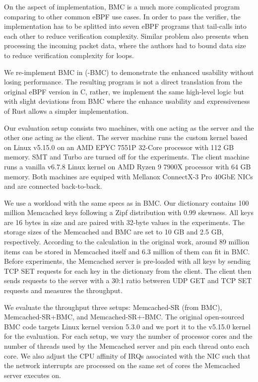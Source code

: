 On the aspect of implementation, BMC is a much more complicated program
    comparing to other common eBPF use cases.
In order to pass the verifier, the implementation has to be splitted into seven
    eBPF programs that tail-calls into each other to reduce verification
    complexity.
Similar problem also presents when processing the incoming packet data, where
    the authors had to bound data size to reduce verification complexity for
    loops.

We re-implement BMC in \projname{} (\projname{}-BMC) to demonstrate the
    enhanced usability without losing performance.
The resulting program is not a direct translation from the original eBPF
    version in C, rather, we implement the same high-level logic but with
    slight deviations from BMC where the enhance usability and expressiveness
    of Rust allows a simpler implementation.

Our evaluation setup consists two machines, with one
    acting as the server and the other one acting as the client.
The server machine runs the \projname{} custom kernel based on Linux v5.15.0 on
    an AMD EPYC 7551P 32-Core processor with 112 GB memory.
SMT and Turbo are turned off for the experiments.
The client machine runs a vanilla v6.7.8 Linux kernel on AMD Ryzen 9 7900X
    processor with 64 GB memory.
Both machines are equiped with Mellanox ConnectX-3 Pro 40GbE NICs and are
    connected back-to-back.


We use a workload with the same specs as in BMC.
Our dictionary contains 100 million Memcached keys following a Zipf
    distribution with 0.99 skewness.
All keys are 16 bytes in size and are paired with 32-byte values in the
    experiments.
The storage sizes of the Memcached and BMC are set to 10 GB and 2.5 GB,
    respectively.
According to the calculation in the original work, around 89 million items
    can be stored in Memcached itself and 6.3 million of them can fit in
    BMC.
Before experiments, the Memcached server is pre-loaded with all keys by
    sending TCP SET requests for each key in the dictionary from the client.
The client then sends requests to the server with a 30:1 ratio betweren UDP GET and
    TCP SET requests and measures the throughput.

We evaluate the throughput three setups: Memcached-SR (from BMC),
    Memcached-SR+BMC, and Memcached-SR+\projname{}-BMC.
The original open-sourced BMC code targets Linux kernel version 5.3.0 and we
    port it to the v5.15.0 \projname{} kernel for the evaluation.
For each setup, we vary the number of processor cores and the number of threads
    used by the Memcached server and pin each thread onto each core.
We also adjust the CPU affinity of IRQs associated with the NIC such that the
    network interrupts are processed on the same set of cores the Memcached
    server executes on.

